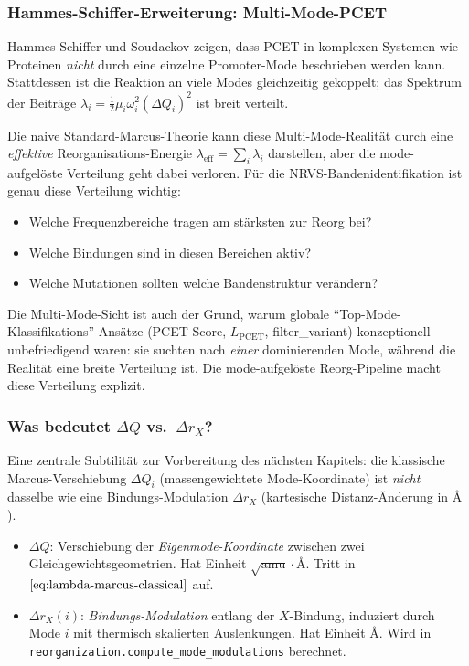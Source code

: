 \documentclass[11pt,a4paper,twoside]{article}
\providecommand{\angstrom}{\text{\AA}}    %
\theoremstyle{remark}
\begin{document}
\subsubsection*{Hammes-Schiffer-Erweiterung: Multi-Mode-PCET}

Hammes-Schiffer und Soudackov \cite{HammesSchifferSoudackov2008}
zeigen, dass PCET in komplexen Systemen wie Proteinen \emph{nicht}
durch eine einzelne Promoter-Mode beschrieben werden kann. Stattdessen
ist die Reaktion an viele Modes gleichzeitig gekoppelt; das Spektrum
der Beitr\"age $\lambda_i = \tfrac{1}{2}\mu_i\omega_i^2(\Delta Q_i)^2$
ist breit verteilt.

Die naive Standard-Marcus-Theorie kann diese Multi-Mode-Realit\"at
durch eine \emph{effektive} Reorganisations-Energie
$\lambda_\text{eff} = \sum_i \lambda_i$ darstellen, aber die
mode-aufgel\"oste Verteilung geht dabei verloren. F\"ur die
NRVS-Bandenidentifikation ist genau diese Verteilung wichtig:

\begin{itemize}\setlength{\itemsep}{0pt}
  \item Welche Frequenzbereiche tragen am st\"arksten zur Reorg bei?
  \item Welche Bindungen sind in diesen Bereichen aktiv?
  \item Welche Mutationen sollten welche Bandenstruktur ver\"andern?
\end{itemize}

Die Multi-Mode-Sicht ist auch der Grund, warum globale
"`Top-Mode-Klassifikations"'-Ans\"atze (PCET-Score, $L_\text{PCET}$,
filter\_variant) konzeptionell unbefriedigend waren: sie suchten nach
\emph{einer} dominierenden Mode, w\"ahrend die Realit\"at eine breite
Verteilung ist. Die mode-aufgel\"oste Reorg-Pipeline macht
diese Verteilung explizit.

\subsubsection*{Was bedeutet $\Delta Q$ vs.\ $\Delta r_X$?}

Eine zentrale Subtilit\"at zur Vorbereitung des n\"achsten Kapitels: die
klassische Marcus-Verschiebung $\Delta Q_i$ (massengewichtete
Mode-Koordinate) ist \emph{nicht} dasselbe wie eine
Bindungs-Modulation $\Delta r_X$ (kartesische Distanz-\"Anderung in
$\angstrom$).

\begin{itemize}\setlength{\itemsep}{0pt}
  \item $\Delta Q$: Verschiebung der \emph{Eigenmode-Koordinate} zwischen
        zwei Gleichgewichtsgeometrien. Hat Einheit
        $\sqrt{\text{amu}}\cdot\angstrom$. Tritt in
        $\eqref{eq:lambda-marcus-classical}$ auf.
  \item $\Delta r_X(i)$: \emph{Bindungs-Modulation} entlang der
        $X$-Bindung, induziert durch Mode $i$ mit thermisch
        skalierten Auslenkungen. Hat Einheit $\angstrom$. Wird in
        \texttt{reorganization.compute\_mode\_modulations} berechnet.
\end{itemize}
\end{document}
